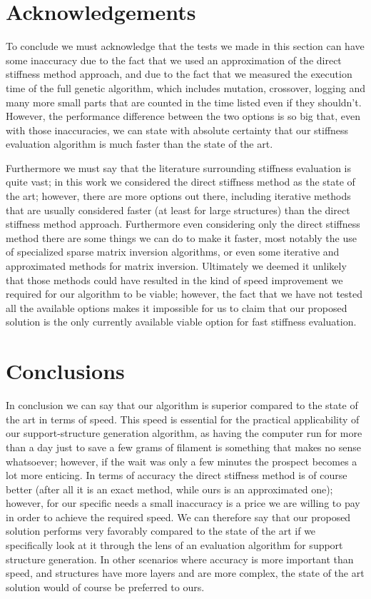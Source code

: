 \section{Acknowledgements}
To conclude we must acknowledge that the tests we made in this section can have some inaccuracy due to the fact
that we used an approximation of the direct stiffness method approach, and due to the fact that we measured
the execution time of the full genetic algorithm, which includes mutation, crossover, logging and many more
small parts that are counted in the time listed even if they shouldn't.
However, the performance difference between the two options is so big that, even with those inaccuracies,
we can state with absolute certainty that our stiffness evaluation algorithm is much faster than the state 
of the art.

Furthermore we must say that the literature surrounding stiffness evaluation is quite vast;
in this work we considered the direct stiffness method as the state of the art; however, there
are more options out there, including iterative methods that are usually considered faster (at least for large
structures) than the direct stiffness method approach. Furthermore even considering only the direct
stiffness method there are some things we can do to make it faster, most notably the use of specialized
sparse matrix inversion algorithms, or even some iterative and approximated methods for matrix inversion.
Ultimately we deemed it unlikely that those methods could have resulted in the kind of speed improvement
we required for our algorithm to be viable; however, the fact that we have not tested all the available
options makes it impossible for us to claim that our proposed solution is the only currently available viable option
for fast stiffness evaluation.

\section{Conclusions}

In conclusion we can say that our algorithm is superior compared to the state of the art in terms of speed.
This speed is essential for the practical applicability of our support-structure generation algorithm,
as having the computer run for more than a day just to save a few grams of filament is something 
that makes no sense whatsoever; however, if the wait was only a few minutes the prospect becomes a lot more enticing.
In terms of accuracy the direct stiffness method is of course better (after all it is an exact
method, while ours is an approximated one); however, for our specific needs a small inaccuracy is a price
we are willing to pay in order to achieve the required speed.
We can therefore say that our proposed solution performs very favorably compared to the state of the art
if we specifically look at it through the lens of an evaluation algorithm for support structure generation.
In other scenarios where accuracy is more important than speed, and structures have more layers and are more
complex, the state of the art solution would of course be preferred to ours.

